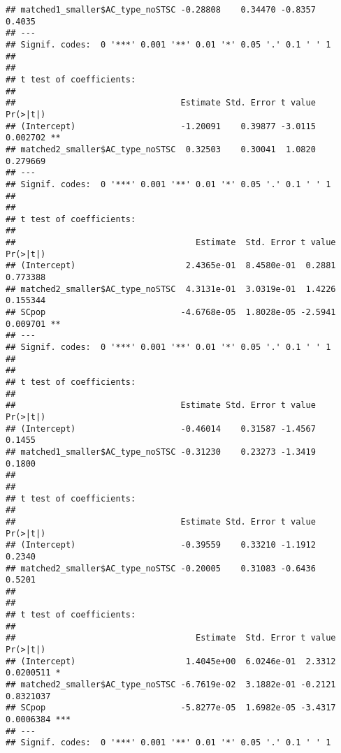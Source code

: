 \documentclass[
]{article}
\begin{document}
\begin{verbatim}
## matched1_smaller$AC_type_noSTSC -0.28808    0.34470 -0.8357   0.4035  
## ---
## Signif. codes:  0 '***' 0.001 '**' 0.01 '*' 0.05 '.' 0.1 ' ' 1
## 
## 
## t test of coefficients:
## 
##                                 Estimate Std. Error t value Pr(>|t|)   
## (Intercept)                     -1.20091    0.39877 -3.0115 0.002702 **
## matched2_smaller$AC_type_noSTSC  0.32503    0.30041  1.0820 0.279669   
## ---
## Signif. codes:  0 '***' 0.001 '**' 0.01 '*' 0.05 '.' 0.1 ' ' 1
## 
## 
## t test of coefficients:
## 
##                                    Estimate  Std. Error t value Pr(>|t|)   
## (Intercept)                      2.4365e-01  8.4580e-01  0.2881 0.773388   
## matched2_smaller$AC_type_noSTSC  4.3131e-01  3.0319e-01  1.4226 0.155344   
## SCpop                           -4.6768e-05  1.8028e-05 -2.5941 0.009701 **
## ---
## Signif. codes:  0 '***' 0.001 '**' 0.01 '*' 0.05 '.' 0.1 ' ' 1
## 
## 
## t test of coefficients:
## 
##                                 Estimate Std. Error t value Pr(>|t|)
## (Intercept)                     -0.46014    0.31587 -1.4567   0.1455
## matched1_smaller$AC_type_noSTSC -0.31230    0.23273 -1.3419   0.1800
## 
## 
## t test of coefficients:
## 
##                                 Estimate Std. Error t value Pr(>|t|)
## (Intercept)                     -0.39559    0.33210 -1.1912   0.2340
## matched2_smaller$AC_type_noSTSC -0.20005    0.31083 -0.6436   0.5201
## 
## 
## t test of coefficients:
## 
##                                    Estimate  Std. Error t value  Pr(>|t|)    
## (Intercept)                      1.4045e+00  6.0246e-01  2.3312 0.0200511 *  
## matched2_smaller$AC_type_noSTSC -6.7619e-02  3.1882e-01 -0.2121 0.8321037    
## SCpop                           -5.8277e-05  1.6982e-05 -3.4317 0.0006384 ***
## ---
## Signif. codes:  0 '***' 0.001 '**' 0.01 '*' 0.05 '.' 0.1 ' ' 1
\end{verbatim}
\end{document}
